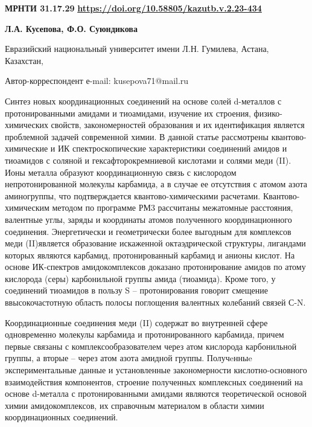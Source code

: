 \newpage
{}
{\bfseries МРНТИ 31.17.29}
\hfill {\bfseries \href{https://doi.org/10.58805/kazutb.v.2.23-434}{https://doi.org/10.58805/kazutb.v.2.23-434}}


\begin{center}
{\bfseries Л.А. Кусепова\envelope, Ф.О. Суюндикова}

Евразийский национальный университет имени Л.Н. Гумилева, Астана,
Казахстан,

\envelope Автор-корреспондент е-mail: kusepova71@mail.ru
\end{center}

Синтез новых координационных соединений на основе солей d-металлов с
протонированными амидами и тиоамидами, изучение их строения,
физико-химических свойств, закономерностей образования и их
идентификация является проблемной задачей современной химии. В данной
статье рассмотрены квантово-химические и ИК спектроскопические
характеристики соединений амидов и тиоамидов с соляной и
гексафторокремниевой кислотами и солями меди (II). Ионы металла образуют
координационную связь с кислородом непротонированной молекулы карбамида,
а в случае ее отсутствия с атомом азота аминогруппы, что подтверждается
квантово-химическими расчетами. Квантово-химическим методом по программе
РМ3 рассчитаны межатомные расстояния, валентные углы, заряды и
координаты атомов полученного координационного соединения. Энергетически
и геометрически более выгодным для комплексов меди (II)является
образование искаженной октаэдрической структуры, лигандами которых
являются карбамид, протонированный карбамид и анионы кислот. На основе
ИК-спектров амидокомплексов доказано протонирование амидов по атому
кислорода (серы) карбонильной группы амида (тиоамида). Кроме того, у
соединений тиоамидов в пользу S -- протонирования говорит смещение
ввысокочастотную область полосы поглощения валентных колебаний связей
С-N.

Координационные соединения меди (II) содержат во внутренней сфере
одновременно молекулы карбамида и протонированного карбамида, причем
первые связаны с комплексообразователем через атом кислорода
карбонильной группы, а вторые -- через атом азота амидной группы.
Получeнныe экспериментальные данные и установленные закономерности
кислотно-основного взаимодействия компонентов, строение полученных
комплексных соединений на основе d-металла с протонированными амидами
являются теоретической основой химии амидокомплексов, их справочным
материалом в области химии координационных соединений.

